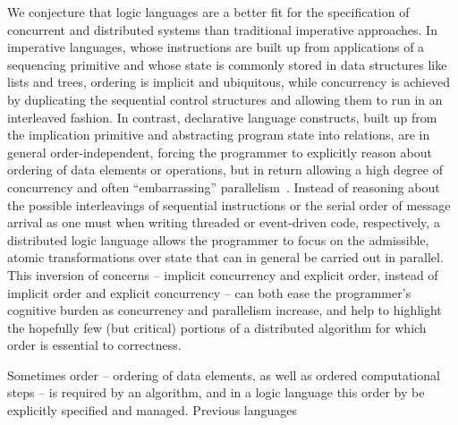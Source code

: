 We conjecture that logic languages are a better fit for the specification of concurrent and distributed systems than traditional imperative approaches.  In imperative languages, whose instructions are built up from applications of a sequencing primitive and whose state is commonly stored in data structures like lists and trees, ordering is implicit and ubiquitous, 
while concurrency is achieved by duplicating the sequential control structures and allowing them
to run in an interleaved fashion.
In contrast, declarative language constructs, built up from the implication primitive and abstracting program state into relations, are in general order-independent, forcing the programmer to explicitly reason about ordering of data elements or operations, but in return allowing a high degree of concurrency and often ``embarrassing'' 
parallelism~\cite{podskey}.  Instead of reasoning about the possible interleavings of sequential
instructions or the serial order of message arrival as one must when writing threaded or 
event-driven code, respectively, a distributed logic language allows the programmer to focus
on the admissible, atomic transformations over state that can in general be carried out in
parallel.  This inversion of concerns -- implicit concurrency and explicit order, instead of
implicit order and explicit concurrency -- can both ease the programmer's cognitive burden as
concurrency and parallelism increase, and help to highlight the hopefully few (but critical) 
portions of a distributed algorithm for which order is essential to correctness. 

Sometimes order -- ordering of data elements, as well as ordered computational steps -- 
is required by an algorithm, and in a logic language this order by be explicitly specified and 
managed.  Previous languages 



